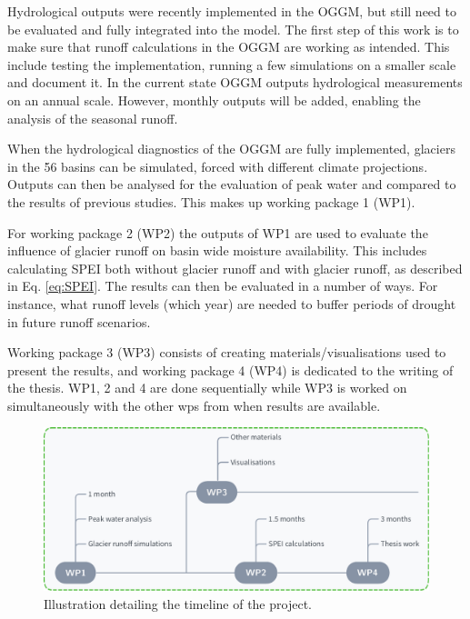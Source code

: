 \documentclass[12pt, a4paper]{article}
\begin{document}
\begin{enumerate}
\end{enumerate}

Hydrological outputs were recently implemented in the OGGM, but still need to be
evaluated and fully integrated into the model. The first step of this work is to
make sure that runoff calculations in the OGGM are working as intended. This
include testing the implementation, running a few simulations on a smaller scale
and document it. In the current state OGGM outputs hydrological measurements on
an annual scale. However, monthly outputs will be added, enabling the analysis
of the seasonal runoff.

When the hydrological diagnostics of the OGGM are fully implemented, glaciers in
the 56 basins can be simulated, forced with different climate projections.
Outputs can then be analysed for the evaluation of peak water and compared to
the results of previous studies. This makes up working package 1 (WP1).

For working package 2 (WP2) the outputs of WP1 are used to evaluate the
influence of glacier runoff on basin wide moisture availability. This includes
calculating SPEI both without glacier runoff and with glacier runoff, as
described in Eq. \ref{eq:SPEI}. The results can then be evaluated in a number of
ways. For instance, what runoff levels (which year) are needed to buffer periods
of drought in future runoff scenarios.

Working package 3 (WP3) consists of creating materials/visualisations used to
present the results, and working package 4 (WP4) is dedicated to the writing of
the thesis. WP1, 2 and 4 are done sequentially while WP3 is worked on
simultaneously with the other wps from when results are available.
\begin{figure}[h]
    \centering
    \includegraphics[width=\textwidth]{../timeline.pdf}
    \caption{Illustration detailing the timeline of the project.}
\end{figure}



\printbibliography
\end{document}
